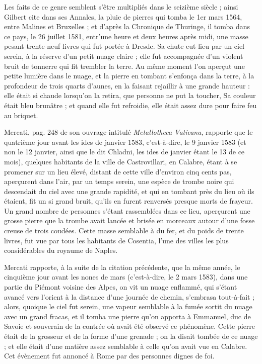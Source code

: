 \documentclass[a4paper, 12pt, oneside, french]{article}
\begin{document}
Les faits de ce genre semblent s'être multipliés dans le seizième siècle ; ainsi Gilbert cite dans ses Annales, la pluie de pierres qui tomba le 1er mars 1564, entre Malines et Bruxelles ; et d'après la Chronique de Thuringe, il tomba dans ce pays, le 26 juillet 1581, entr'une heure et deux heures après midi, une masse pesant trente-neuf livres qui fut portée à Dresde. Sa chute eut lieu par un ciel serein, à la réserve d'un petit nuage claire ; elle fut accompagnée d'un violent bruit de tonnerre qui fit trembler la terre. Au même moment l'on aperçut une petite lumière dans le nuage, et la pierre en tombant s'enfonça dans la terre, à la profondeur de trois quarts d'aunes, en la faisant rejaillir à une grande hauteur : elle était si chaude lorsqu’on la retira, que personne ne put la toucher, Sa couleur était bleu brunâtre ; et quand elle fut refroidie, elle était assez dure pour faire feu au briquet.

Mercati, pag. 248 de son ouvrage intitulé \emph{Metallotheca Vaticana}, rapporte que le quatrième jour avant les ides de janvier 1583, c'est-à-dire, le 9 janvier 1583 (et non le 12 janvier, ainsi que le dit Chladni, les ides de janvier étant le 13 de ce mois), quelques habitants de la ville de Castrovillari, en Calabre, étant à se promener sur un lieu élevé, distant de cette ville d'environ cinq cents pas, aperçurent dans l'air, par un temps serein, une espèce de trombe noire qui descendait du ciel avec une grande rapidité, et qui en tombant près du lieu où ils étaient, fit un si grand bruit, qu'ils en furent renversés presque morts de frayeur. Un grand nombre de personnes s'étant rassemblées dans ce lieu, aperçurent une grosse pierre que la trombe avait lancée et brisée en morceaux autour d'une fosse creuse de trois coudées. Cette masse semblable à du fer, et du poids de trente livres, fut vue par tous les habitants de Cosentia, l'une des villes les plus considérables du royaume de Naples.

Mercati rapporte, à la suite de la citation précédente, que la même année, le cinquième jour avant les nones de mars (c'est-à-dire, le 2 mars 1583), dans une partie du Piémont voisine des Alpes, on vit un nuage enflammé, qui s'étant avancé vers l'orient à la distance d'une journée de chemin, s'embrasa tout-à-fait ; alors, quoique le ciel fut serein, une vapeur semblable à la fumée sortit du nuage avec un grand fracas, et il tomba une pierre qu'on apporta à Emmanuel, duc de Savoie et souverain de la contrée où avait été observé ce phénomène. Cette pierre était de la grosseur et de la forme d'une grenade ; on la disait tombée de ce nuage ; et elle était d'une matière assez semblable à celle qu'on avait vue en Calabre. Cet évènement fut annoncé à Rome par des personnes dignes de foi.
\end{document}
